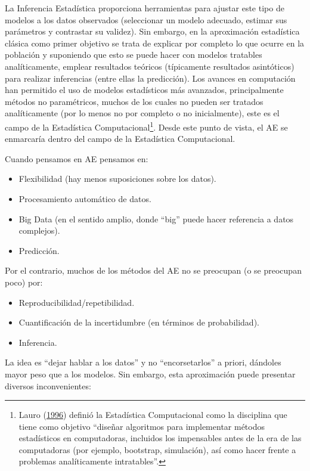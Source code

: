 \documentclass[
]{book}
\theoremstyle{break}
\theoremstyle{nonumberplain}
\begin{document}
La Inferencia Estadística proporciona herramientas para ajustar este tipo de modelos a los datos observados (seleccionar un modelo adecuado, estimar sus parámetros y contrastar su validez).
Sin embargo, en la aproximación estadística clásica como primer objetivo se trata de explicar por completo lo que ocurre en la población y suponiendo que esto se puede hacer con modelos tratables analíticamente, emplear resultados teóricos (típicamente resultados asintóticos) para realizar inferencias (entre ellas la predicción).
Los avances en computación han permitido el uso de modelos estadísticos más avanzados, principalmente métodos no paramétricos, muchos de los cuales no pueden ser tratados analíticamente (por lo menos no por completo o no inicialmente), este es el campo de la Estadística Computacional\footnote{Lauro (\protect\hyperlink{ref-lauro1996computational}{1996}) definió la Estadística Computacional como la disciplina que tiene como objetivo ``diseñar algoritmos para implementar métodos estadísticos en computadoras, incluidos los impensables antes de la era de las computadoras (por ejemplo, bootstrap, simulación), así como hacer frente a problemas analíticamente intratables''.}.
Desde este punto de vista, el AE se enmarcaría dentro del campo de la Estadística Computacional.

Cuando pensamos en AE pensamos en:

\begin{itemize}
\item
  Flexibilidad (hay menos suposiciones sobre los datos).
\item
  Procesamiento automático de datos.
\item
  Big Data (en el sentido amplio, donde ``big'' puede hacer referencia a datos complejos).
\item
  Predicción.
\end{itemize}

Por el contrario, muchos de los métodos del AE no se preocupan (o se preocupan poco) por:

\begin{itemize}
\item
  Reproducibilidad/repetibilidad.
\item
  Cuantificación de la incertidumbre (en términos de probabilidad).
\item
  Inferencia.
\end{itemize}

La idea es ``dejar hablar a los datos'' y no ``encorsetarlos'' a priori, dándoles mayor peso que a los modelos.
Sin embargo, esta aproximación puede presentar diversos inconvenientes:
\end{document}
